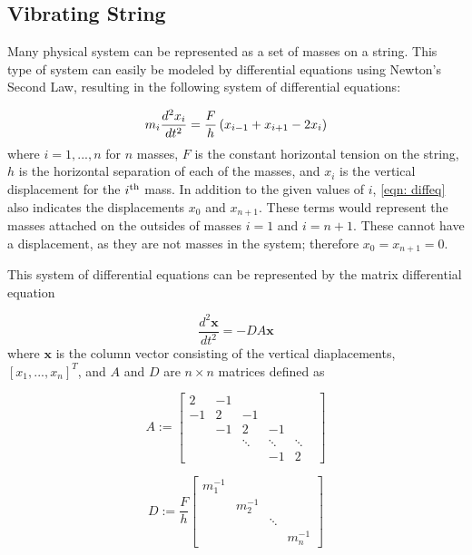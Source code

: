 \documentclass[10pt,a4paper]{article}
\renewcommand{\vec}[1]{\boldsymbol{#1}}
\begin{document}
\begin{multicols*}{2}
\section*{Vibrating String}

Many physical system can be represented as a set of masses on a string. This type of system can easily be modeled by differential equations using Newton's Second Law, resulting in the following system of differential equations:

\begin{equation}
	m_i \frac{d^2 x_i}{dt^2} = \frac{F}{h} \left(  x_{i-1} + x_{i+1} -2 x_i \right)
	\label{eqn: diffeq}
\end{equation}
where $i = 1, ..., n$ for $n$ masses, $F$ is the constant horizontal tension on the string, $h$ is the horizontal separation of each of the masses, and $x_i$ is the vertical displacement for the $i^{\rm{th}}$ mass. In addition to the given values of $i$, \cref{eqn: diffeq} also indicates the displacements $x_0$ and $x_{n+1}$. These terms would represent the masses attached on the outsides of masses $i = 1$ and $i = n+1$. These cannot have a displacement, as they are not masses in the system; therefore $x_0 = x_{n+1} = 0$.

This system of differential equations can be represented by the matrix differential equation

\begin{equation}
	\frac{d^2 \vec{x}}{dt^2} = -DA \vec{x}
	\label{eqn: matrixdiffeq}
\end{equation}
where $\vec{x}$ is the column vector consisting of the vertical diaplacements, $ \left[ x_1, ..., x_n \right]^T$, and $A$ and $D$ are $n \times n$ matrices defined as

$$
A :=
	\begin{bmatrix}
		2 & -1 &  & & &  \\
		-1 & 2 & -1 &   & &  \\
		   & -1 & 2 & -1 \\
		   & & \ddots & \ddots & \ddots  \\
		   &  & & -1 & 2
	\end{bmatrix}
$$



$$
D := \frac{F}{h} 
	\begin{bmatrix}
		m_1^{-1} \\
		& m_2^{-1} \\
		& & \ddots \\
		& & & m_n^{-1}
	\end{bmatrix}
$$


\end{multicols*}
\end{document}
